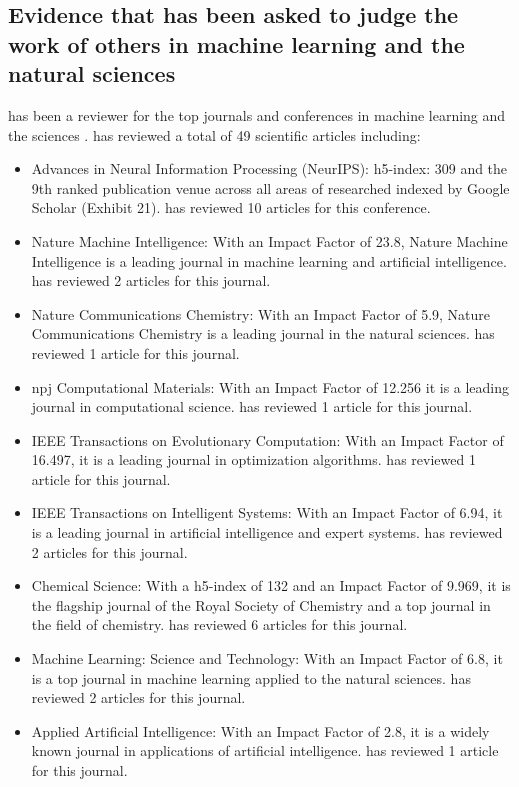 \documentclass[11pt]{article}
\begin{document}
\subsection{Evidence that \dr has been asked to judge the work of others in machine learning and the natural sciences}
\label{reviews}

\dr has been a reviewer for the top journals and conferences in machine learning and the sciences \cite{reviews}. \dr has reviewed a total of 49 scientific articles including:
\begin{itemize}
    \item Advances in Neural Information Processing (NeurIPS): h5-index: 309 and the 9th ranked publication venue across all areas of researched indexed by Google Scholar (Exhibit 21). \dr has reviewed 10 articles for this conference.
    \item Nature Machine Intelligence: With an Impact Factor of 23.8, Nature Machine Intelligence is a leading journal in machine learning and artificial intelligence. \dr has reviewed 2 articles for this journal.
    \item Nature Communications Chemistry: With an Impact Factor of 5.9, Nature Communications Chemistry is a leading journal in the natural sciences. \dr has reviewed 1 article for this journal.
    \item npj Computational Materials: With an Impact Factor of 12.256 it is a leading journal in computational science. \dr has reviewed 1 article for this journal.
    \item IEEE Transactions on Evolutionary Computation: With an Impact Factor of 16.497, it is a leading journal in optimization algorithms. \dr has reviewed 1 article for this journal.
    \item IEEE Transactions on Intelligent Systems: With an Impact Factor of 6.94, it is a leading journal in artificial intelligence and expert systems. \dr has reviewed 2 articles for this journal.
    \item Chemical Science: With a h5-index of 132 and an Impact Factor of 9.969, it is the flagship journal of the Royal Society of Chemistry and a top journal in the field of chemistry. \dr has reviewed 6 articles for this journal.
    \item Machine Learning: Science and Technology: With an Impact Factor of 6.8, it is a top journal in machine learning applied to the natural sciences. \dr has reviewed 2 articles for this journal.
    \item Applied Artificial Intelligence: With an Impact Factor of 2.8, it is a widely known journal in applications of artificial intelligence. \dr has reviewed 1 article for this journal.

\end{itemize}
\end{document}
